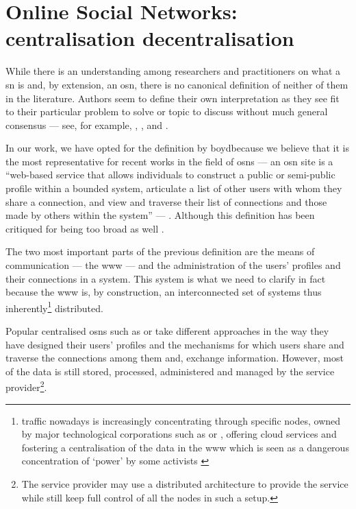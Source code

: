 \section{Online Social Networks: centralisation \vs decentralisation}
    \label{section:thesis:osns-centralisation-vs-decentralisation}
While there is an understanding among researchers and practitioners on what a \ac{sn} 
is and, by extension, an \ac{osn}, there is no canonical definition of neither of 
them in the literature. Authors seem to define their own interpretation as they 
see fit to their particular problem to solve or topic to discuss without much general 
consensus --- see, for example, \cite{AdamicA05}, \cite{DwyerHP07}, \cite{SchneiderFKW09} 
and \cite{RichterRB11}.

In our work, we have opted for the definition by boyd\etal because we believe that 
it is the most representative for recent works in the field of \acp{osn} --- an 
\ac{osn} site is a ``web-based service that allows individuals to construct a public 
or semi-public profile within a bounded system, articulate a list of other users 
with whom they share a connection, and view and traverse their list of connections 
and those made by others within the system'' --- \cite{boydE07}. Although this definition 
has been critiqued for being too broad as well \cite{Beer08}.

The two most important parts of the previous definition are the means of communication 
--- the \ac{www} --- and the administration of the users' profiles and their connections 
in a system. This system is what we need to clarify in fact because the \ac{www} 
is, by construction, an interconnected set of systems thus inherently\footnote{
\Internet traffic nowadays is increasingly concentrating through specific nodes, 
owned by major technological corporations such as \Amazon or \Google, offering cloud 
services and fostering a centralisation of the data in the \ac{www} which is seen 
as a dangerous concentration of `power' by some activists \cite{Bolychevsky13}} 
distributed.

Popular centralised \acp{osn} such as \Facebook or \Twitter take different approaches 
in the way they have designed their users' profiles and the mechanisms for which 
users share and traverse the connections among them and, exchange information. However, 
most of the data is still stored, processed, administered and managed by the service 
provider\footnote{The service provider may use a distributed architecture to provide 
the service while still keep full control of all the nodes in such a setup.}.

